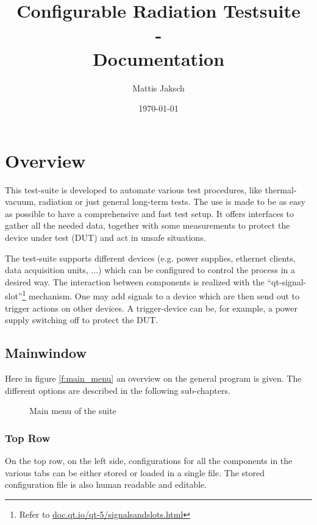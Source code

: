 \documentclass[10pt,a4paper]{article}
\title{Configurable Radiation Testsuite \\- \\Documentation}
\author{Mattis Jaksch}
\date{\today}
\begin{document}
\maketitle

\tableofcontents

\flushleft

\newpage

\section{Overview}
This test-suite is developed to automate various test procedures, like thermal-vacuum, radiation or just general long-term tests. The use is made to be as easy as possible to have a comprehensive and fast test setup. It offers interfaces to gather all the needed data, together with some measurements to protect the device under test (DUT) and act in unsafe situations.

\bigbreak

The test-suite supports different devices (e.g. power supplies, ethernet clients, data acquisition units, ...) which can be configured to control the process in a desired way. The interaction between components is realized with the \enquote{qt-signal-slot}\footnote{Refer to \url{doc.qt.io/qt-5/signalsandslots.html}} mechanism. One may add signals to a device which are then send out to trigger actions on other devices. A trigger-device can be, for example, a power supply switching off to protect the DUT.

	\subsection{Mainwindow}
	Here in figure \eqref{f:main_menu} an overview on the general program is given. The different options are described in the following sub-chapters.
	
	\begin{figure}[H]
\centering

\caption{Main menu of the suite}
\label{f:main_menu}
	\end{figure}
	
	\subsubsection{Top Row}	
	
	On the top row, on the left side, configurations for all the components in the various tabs can be either stored or loaded in a single file. The stored configuration file is also human readable and editable.
	
\end{document}
